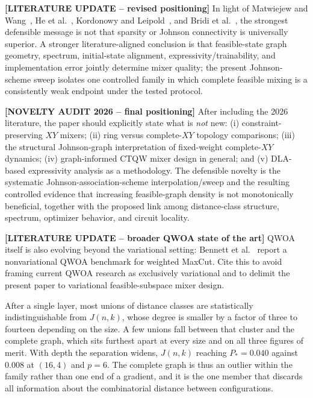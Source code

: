 {\color{red}\textbf{[LITERATURE UPDATE -- revised positioning]} In light of Matwiejew and Wang~\cite{Matwiejew2024}, He et al.~\cite{He2023}, Kordonowy and Leipold~\cite{Kordonowy2026}, and Bridi et al.~\cite{Bridi2026Expressivity}, the strongest defensible message is not that sparsity or Johnson connectivity is universally superior. A stronger literature-aligned conclusion is that feasible-state graph geometry, spectrum, initial-state alignment, expressivity/trainability, and implementation error jointly determine mixer quality; the present Johnson-scheme sweep isolates one controlled family in which complete feasible mixing is a consistently weak endpoint under the tested protocol.}

{\color{red}\textbf{[NOVELTY AUDIT 2026 -- final positioning]} After including the 2026 literature, the paper should explicitly state what is \emph{not} new: (i) constraint-preserving $XY$ mixers; (ii) ring versus complete-$XY$ topology comparisons; (iii) the structural Johnson-graph interpretation of fixed-weight complete-$XY$ dynamics; (iv) graph-informed CTQW mixer design in general; and (v) DLA-based expressivity analysis as a methodology. The defensible novelty is the systematic Johnson-association-scheme interpolation/sweep and the resulting controlled evidence that increasing feasible-graph density is not monotonically beneficial, together with the proposed link among distance-class structure, spectrum, optimizer behavior, and circuit locality.}

{\color{red}\textbf{[LITERATURE UPDATE -- broader QWOA state of the art]} QWOA itself is also evolving beyond the variational setting: Bennett et al.~\cite{Bennett2026Nonvariational} report a nonvariational QWOA benchmark for weighted MaxCut. Cite this to avoid framing current QWOA research as exclusively variational and to delimit the present paper to variational feasible-subspace mixer design.}

After a single layer, most unions of distance classes are statistically indistinguishable from $J(n,k)$, whose degree is smaller by a factor of three to fourteen depending on the size. A few unions fall between that cluster and the complete graph, which sits furthest apart at every size and on all three figures of merit. With depth the separation widens, $J(n,k)$ reaching $P_*=0.040$ against $0.008$ at $(16,4)$ and $p=6$. The complete graph is thus an outlier within the family rather than one end of a gradient, and it is the one member that discards all information about the combinatorial distance between configurations.

